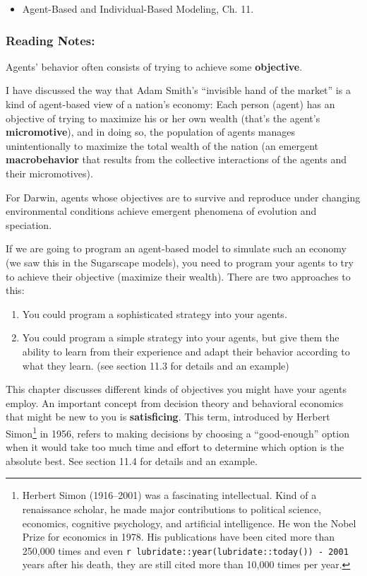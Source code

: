 \documentclass[
]{article}
\providecommand{\tightlist}{%
  \setlength{\itemsep}{0pt}\setlength{\parskip}{0pt}}
\begin{document}
\begin{itemize}
\tightlist
\item
  Agent-Based and Individual-Based Modeling, Ch. 11.
\end{itemize}

\hypertarget{reading-notes-10}{%
\subsubsection{Reading Notes:}\label{reading-notes-10}}

Agents' behavior often consists of trying to achieve some
\textbf{objective}.

I have discussed the way that Adam Smith's ``invisible hand of the
market'' is a kind of agent-based view of a nation's economy: Each
person (agent) has an objective of trying to maximize his or her own
wealth (that's the agent's \textbf{micromotive}), and in doing so, the
population of agents manages unintentionally to maximize the total
wealth of the nation (an emergent \textbf{macrobehavior} that results
from the collective interactions of the agents and their micromotives).

For Darwin, agents whose objectives are to survive and reproduce under
changing environmental conditions achieve emergent phenomena of
evolution and speciation.

If we are going to program an agent-based model to simulate such an
economy (we saw this in the Sugarscape models), you need to program your
agents to try to achieve their objective (maximize their wealth). There
are two approaches to this:

\begin{enumerate}
\def\labelenumi{\arabic{enumi}.}
\tightlist
\item
  You could program a sophisticated strategy into your agents.
\item
  You could program a simple strategy into your agents, but give them
  the ability to learn from their experience and adapt their behavior
  according to what they learn. (see section 11.3 for details and an
  example)
\end{enumerate}

This chapter discusses different kinds of objectives you might have your
agents employ. An important concept from decision theory and behavioral
economics that might be new to you is \textbf{satisficing}. This term,
introduced by Herbert Simon\footnote{Herbert Simon (1916--2001) was a
  fascinating intellectual. Kind of a renaissance scholar, he made major
  contributions to political science, economics, cognitive psychology,
  and artificial intelligence. He won the Nobel Prize for economics in
  1978. His publications have been cited more than 250,000 times and
  even \texttt{r\ lubridate::year(lubridate::today())\ -\ 2001} years
  after his death, they are still cited more than 10,000 times per year.}
in 1956, refers to making decisions by choosing a ``good-enough'' option
when it would take too much time and effort to determine which option is
the absolute best. See section 11.4 for details and an example.
\end{document}
